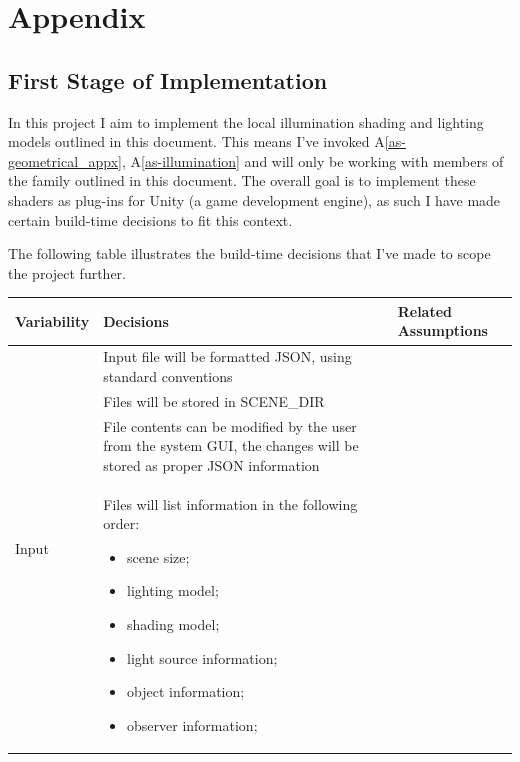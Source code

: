 \documentclass[12pt]{article}
\newcommand{\aref}[1]{A\ref{#1}}
\begin{document}
\section{Appendix}

\subsection{First Stage of Implementation}

In this project I aim to implement the local illumination shading and lighting 
models outlined in this document. This means I've invoked 
\aref{as-geometrical_appx}, \aref{as-illumination} and will only be working 
with members of the family outlined in this document. The overall goal is to 
implement these shaders as plug-ins for Unity (a game development engine), as 
such I have made certain build-time decisions to fit this context.

The following table illustrates the build-time decisions that I've made to 
scope the project further.
\begin{table}[H]
	\begin{tabular}{|p{4cm}|p{8cm}|p{2.4cm}|}
		\hline
		\textbf{Variability} & \textbf{Decisions} & 
		\textbf{Related Assumptions}\\
		\hline
		\multirow{4}{*}{Input} & Input file will be formatted JSON, using 
		standard conventions & \\
		& Files will be stored in SCENE\_DIR & \\
		& File contents can be modified by the user from the system GUI, 
		the changes will be stored as proper JSON information & \\
		& Files will list information in the following order:
		\begin{itemize}
			\item scene size;
			\item lighting model;
			\item shading model;
			\item light source information;
			\item object information;
			\item observer information;			
		\end{itemize}	& \\
		\hline
	\end{tabular}
\end{table}
\end{document}
